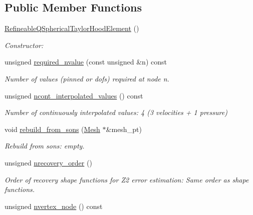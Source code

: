 \subsection*{Public Member Functions}
\begin{DoxyCompactItemize}
\item 
\hyperlink{classoomph_1_1RefineableQSphericalTaylorHoodElement_ae5d1a4f1c2aa7b1322afcb91b0661ae3}{Refineable\+Q\+Spherical\+Taylor\+Hood\+Element} ()
\begin{DoxyCompactList}\small\item\em Constructor\+: \end{DoxyCompactList}\item 
unsigned \hyperlink{classoomph_1_1RefineableQSphericalTaylorHoodElement_af98a332a45e09b9746cd371c5f9cc109}{required\+\_\+nvalue} (const unsigned \&n) const
\begin{DoxyCompactList}\small\item\em Number of values (pinned or dofs) required at node n. \end{DoxyCompactList}\item 
unsigned \hyperlink{classoomph_1_1RefineableQSphericalTaylorHoodElement_a613dbf83fb63f7a6cfee3bee9336b99d}{ncont\+\_\+interpolated\+\_\+values} () const
\begin{DoxyCompactList}\small\item\em Number of continuously interpolated values\+: 4 (3 velocities + 1 pressure) \end{DoxyCompactList}\item 
void \hyperlink{classoomph_1_1RefineableQSphericalTaylorHoodElement_a52c98dc0cc33e2e756ca2873639d641b}{rebuild\+\_\+from\+\_\+sons} (\hyperlink{classoomph_1_1Mesh}{Mesh} $\ast$\&mesh\+\_\+pt)
\begin{DoxyCompactList}\small\item\em Rebuild from sons\+: empty. \end{DoxyCompactList}\item 
unsigned \hyperlink{classoomph_1_1RefineableQSphericalTaylorHoodElement_ae08d92d00ba848f4c6f14ad83433334e}{nrecovery\+\_\+order} ()
\begin{DoxyCompactList}\small\item\em Order of recovery shape functions for Z2 error estimation\+: Same order as shape functions. \end{DoxyCompactList}\item 
unsigned \hyperlink{classoomph_1_1RefineableQSphericalTaylorHoodElement_a9b9f57dd6068133cf6b90ff478e96ac5}{nvertex\+\_\+node} () const

\end{DoxyCompactItemize}
